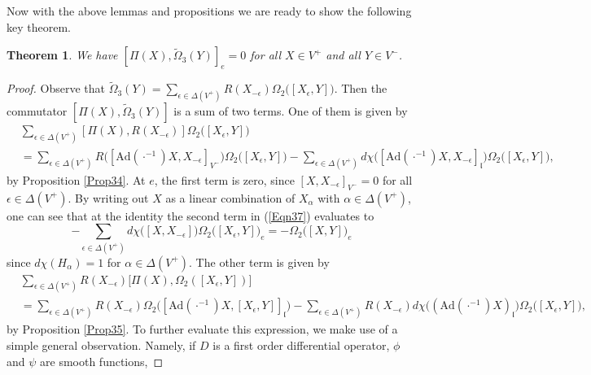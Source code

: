 \documentclass[11pt]{amsart}
\newtheorem{Thm}[equation]{Theorem}
\numberwithin{equation}{section}
\begin{document}
Now with the above lemmas and propositions
we are ready to show the following key theorem.

\begin{Thm}\label{Thm36}
We have $[\Pi(X), \tilde{\Omega}_3(Y)]_e = 0$ for all $X \in V^+$ and all $Y \in V^-$.
\end{Thm}

\begin{proof}
Observe that 
$\tilde{\Omega}_3(Y) = \sum_{{\epsilon} \in {\Delta}(V^+)} R(X_{-{\epsilon}})\Omega_2\big( [X_{\epsilon}, Y] \big)$.
Then the commutator $[\Pi(X), \tilde{\Omega}_3(Y)]$ is a sum of two terms.
One of them is given by
\begin{align}\label{Eqn37}
&\sum_{{\epsilon}\in{\Delta}(V^+)}[\Pi(X), R(X_{-{\epsilon}})]\Omega_2\big( [X_{\epsilon}, Y]\big)\\
&=
\sum_{{\epsilon}\in{\Delta}(V^+)}R\big([{\text{Ad}}(\cdot^{-1})X, X_{-{\epsilon}}]_{V^-}\big) \Omega_2\big( [X_{\epsilon}, Y] \big)
-\sum_{{\epsilon}\in{\Delta}(V^+)}
 d\chi\big( [{\text{Ad}}(\cdot^{-1})X, X_{-{\epsilon}}]_{{\mathfrak l}}\big) \Omega_2\big([X_{\epsilon}, Y]\big),
\nonumber
\end{align}
by Proposition \ref{Prop34}. At $e$, the first term is zero,
since $[X, X_{-{\epsilon}}]_{V^-} = 0$ for all ${\epsilon} \in {\Delta}(V^+)$.
By writing out $X$ as a linear combination of $X_{\alpha}$
with ${\alpha} \in {\Delta}(V^+)$,
one can see that at the identity the second term in (\ref{Eqn37}) evaluates to
\begin{equation*}
-\sum_{{\epsilon}\in{\Delta}(V^+)} d\chi\big( [X, X_{-{\epsilon}}]\big) \Omega_2\big([X_{\epsilon}, Y]\big)_e
=-\Omega_2\big([X,Y]\big)_e
\end{equation*}
since $d\chi(H_{\alpha})=1$ for ${\alpha} \in {\Delta}(V^+)$. 
The other term is given by
\begin{align}\label{Eqn38}
&\sum_{{\epsilon}\in{\Delta}(V^+)} R(X_{-{\epsilon}})\big[\Pi(X), \Omega_2( [X_{\epsilon}, Y])\big]\\
&= \sum_{{\epsilon}\in{\Delta}(V^+)} R(X_{-{\epsilon}})\Omega_2\big([{\text{Ad}}(\cdot^{-1})X,[X_{\epsilon}, Y]]_{{\mathfrak l}}\big)
- \sum_{{\epsilon}\in{\Delta}(V^+)}
 R(X_{-{\epsilon}})d\chi\big( ({\text{Ad}}(\cdot^{-1})X)_{{\mathfrak l}} \big)\Omega_2\big([X_{\epsilon},Y]\big), \nonumber
\end{align}
by Proposition \ref{Prop35}. 
To further evaluate this expression, we make use of a simple general observation.
Namely, if $D$ is a first order differential operator, $\phi$ and $\psi$ are smooth functions,

\end{proof}
\end{document}
